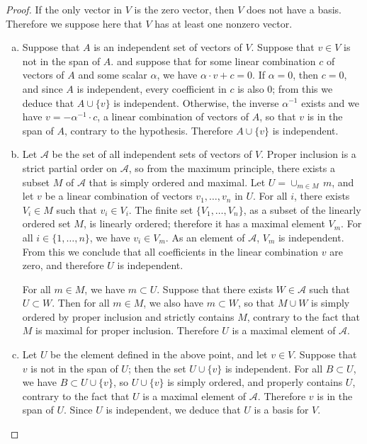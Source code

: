 \documentclass[11pt,a4paper,twoside]{article}
\theoremstyle{definition}
\begin{document}
\begin{proof} \hfill

  If the only vector in $V$ is the zero vector, then $V$ does not have a basis. Therefore we
  suppose here that $V$ has at least one nonzero vector.

  \begin{enumerate}[(a)]

  \item Suppose that $A$ is an independent set of vectors of $V$. Suppose that $v \in V$
    is not in the span of $A$. and suppose that for some linear combination $c$ of vectors of $A$
    and some scalar $\alpha$, we have $\alpha \cdot v + c = 0$. If $\alpha = 0$, then $c = 0$,
    and since $A$ is independent, every coefficient in $c$ is also $0$; from this we deduce that
    $A \cup \{ v \}$ is independent. Otherwise, the inverse $\alpha^{-1}$ exists and we have
    $v = - \alpha^{-1} \cdot c$, a linear combination of vectors of $A$, so that $v$ is in the span
    of $A$, contrary to the hypothesis. Therefore $A \cup \{ v \}$ is independent.

  \item Let $\mathscr{A}$ be the set of all independent sets of vectors of $V$. Proper inclusion
    is a strict partial order on $\mathscr{A}$, so from the maximum principle, there exists a subset
    $M$ of $\mathscr{A}$ that is simply ordered and maximal. Let $U = \cup_{m \in M} \,m$,
    and let $v$ be a linear combination of vectors $v_1, \dotsc, v_n$ in $U$.
    For all $i$, there exists $V_i \in M$ such that $v_i \in V_i$. The finite set $\{ V_1, \dotsc, V_n \}$,
    as a subset of the linearly ordered set $M$, is linearly ordered; therefore it has
    a maximal element $V_m$. For all $i \in \{ 1, \dotsc, n \}$, we have $v_i \in V_m$. As an element
    of $\mathscr{A}$, $V_m$ is independent. From this we conclude that all coefficients in the
    linear combination $v$ are zero, and therefore $U$ is independent.

    For all $m \in M$, we have $m \subset U$. Suppose that there exists $W \in \mathscr{A}$
    such that $U \subset W$. Then for all $m \in M$, we also have $m \subset W$, so that $M \cup W$
    is simply ordered by proper inclusion and strictly contains $M$, contrary to the fact that
    $M$ is maximal for proper inclusion. Therefore $U$ is a maximal element of $\mathscr{A}$.

  \item Let $U$ be the element defined in the above point, and let $v \in V$. Suppose that $v$ is
    not in the span of $U$; then the set $U \cup \{ v \}$ is independent. For all $B \subset U$,
    we have $B \subset U \cup \{ v \}$, so $U \cup \{ v \}$ is simply ordered, and properly contains $U$,
    contrary to the fact that $U$ is a maximal element of $\mathscr{A}$.
    Therefore $v$ is in the span of $U$. Since $U$ is independent, we deduce that $U$ is a basis for $V$.

  \end{enumerate}

\end{proof}
\end{document}
